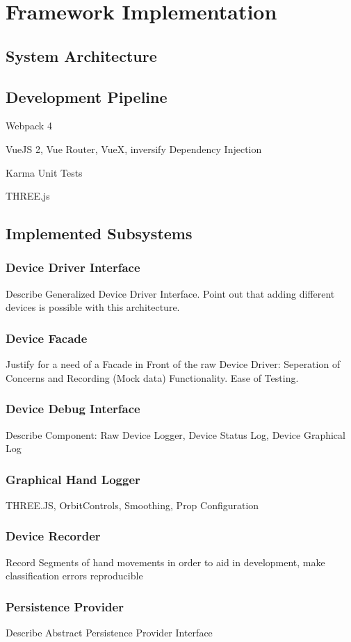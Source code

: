 \chapter{Framework Implementation}
\section{System Architecture}
\section{Development Pipeline}
Webpack 4

VueJS 2, Vue Router, VueX, inversify Dependency Injection

Karma Unit Tests

THREE.js
\section{Implemented Subsystems}
\subsection{Device Driver Interface}
Describe Generalized Device Driver Interface. Point out that adding different devices is possible with this architecture.
\subsection{Device Facade}
Justify for a need of a Facade in Front of the raw Device Driver: Seperation of Concerns and Recording (Mock data) Functionality. Ease of Testing.
\subsection{Device Debug Interface}
Describe Component: Raw Device Logger, Device Status Log, Device Graphical Log
\subsection{Graphical Hand Logger}
THREE.JS, OrbitControls, Smoothing, Prop Configuration
\subsection{Device Recorder}
Record Segments of hand movements in order to aid in development, make classification errors reproducible
\subsection{Persistence Provider}
Describe Abstract Persistence Provider Interface

